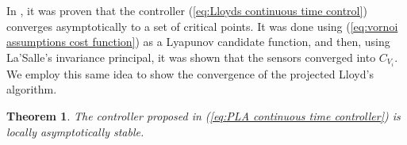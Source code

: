 \documentclass{iacas}
\newtheorem{theorem}{Theorem}
\begin{document}
In \cite{Cortes2004}, it was proven that the controller (\ref{eq:Lloyds continuous time control}) converges asymptotically to a set of critical points. It was done using (\ref{eq:vornoi assumptions cost function}) as a Lyapunov candidate function, and then, using La'Salle's invariance principal, it was shown that the sensors converged into $C_{V_i}$.  We employ this same idea to show the convergence of the projected Lloyd's algorithm.
\begin{theorem}
The controller proposed in (\ref{eq:PLA continuous time controller}) is locally asymptotically stable.
\end{theorem}
\end{document}
